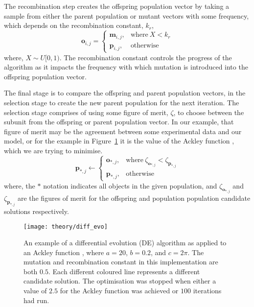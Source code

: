 The recombination step creates the offspring population vector by taking a sample from either the parent population or mutant vectors with some frequency, which depends on the recombination constant, $k_r$,
%
\begin{equation}
    \mathbf{o}_{i,j} =
  \begin{cases}
    \mathbf{m}_{i,j}, & \text{where}\ X < k_r \\
    \mathbf{p}_{i,j}, & \text{otherwise}
  \end{cases}
\end{equation}
%
where, $X\sim U[0, 1)$.
The recombination constant controls the progress of the algorithm as it impacts the frequency with which mutation is introduced into the offspring population vector.

The final stage is to compare the offspring and parent population vectors, in the selection stage to create the new parent population for the next iteration.
The selection stage comprises of using some figure of merit, $\zeta$, to choose between the subunit from the offspring or parent population vector.
In our example, that figure of merit may be the agreement between some experimental data and our model, or for the example in Figure~\ref{fig:diff_evo} it is the value of the Ackley function \cite{ackley_connectionist_1987}, which we are trying to minimise.
%
\begin{equation}
    \mathbf{p}_{*,j} \leftarrow
    \begin{cases}
        \mathbf{o}_{*,j}, & \text{where}\ \zeta_{\mathbf{o}_{*,j}} < \zeta_{\mathbf{p}_{*,j}} \\
        \mathbf{p}_{*,j}, & \text{otherwise}
    \end{cases}
\end{equation}
%
where, the $*$ notation indicates all objects in the given population, and $\zeta_{\mathbf{o}_{*,j}}$ and $\zeta_{\mathbf{p}_{*,j}}$ are the figures of merit for the offspring and population population candidate solutions respectively.
%
\begin{figure}
    \centering
    \texttt{[image: theory/diff\_evo]}
    \caption{An example of a differential evolution (DE) algorithm as applied to an Ackley function \cite{ackley_connectionist_1987}, where $a=20$, $b=0.2$, and $c=2\pi$. The mutation and recombination constant in this implementation are both $0.5$. Each different coloured line represents a different candidate solution. The optimisation was stopped when either a value of $2.5$ for the Ackley function was achieved or $100$ iterations had run.}
    \label{fig:diff_evo}
\end{figure}
%

